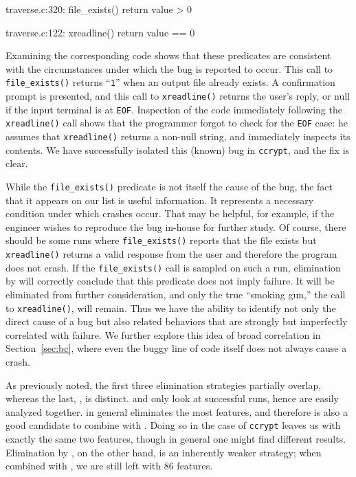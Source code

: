 \begin{features}
\item traverse.c:320: file\_exists() return value > 0
\item traverse.c:122: xreadline() return value == 0
\end{features}

Examining the corresponding code shows that these predicates are
consistent with the circumstances under which the bug is reported to
occur.  This call to \texttt{file\_exists()} returns ``\texttt{1}'' when an output
file already exists.  A confirmation prompt is presented, and this
call to \texttt{xreadline()} returns the user's reply, or null if the
input terminal is at \texttt{EOF}.  Inspection of the code immediately
following the \texttt{xreadline()} call shows that the programmer
forgot to check for the \texttt{EOF} case: he assumes that
\texttt{xreadline()} returns a non-null string, and immediately
inspects its contents.  We have successfully isolated this (known) bug
in \texttt{ccrypt}, and the fix is clear.

While the \texttt{file\_exists()} predicate is not itself the cause of
the bug, the fact that it appears on our list is useful information.
It represents a necessary condition under which crashes occur.  That
may be helpful, for example, if the engineer wishes to reproduce the
bug in-house for further study.  Of course, there should be some runs
where \texttt{file\_exists()} reports that the file exists but
\texttt{xreadline()} returns a valid response from the user and
therefore the program does not crash.  If the \texttt{file\_exists()}
call is sampled on such a run, elimination by  will correctly conclude that this predicate does not
imply failure.  It will be eliminated from further consideration, and
only the true ``smoking gun,'' the call to \texttt{xreadline()}, will
remain.  Thus we have the ability to identify not only the direct
cause of a bug but also related behaviors that are strongly but
imperfectly correlated with failure.  We further explore this idea of
broad correlation in Section~\ref{sec:bc}, where even the buggy line
of code itself does not always cause a crash.

As previously noted, the first three elimination strategies partially
overlap, whereas the last, , is
distinct.   and  only look at successful runs, hence are easily
analyzed together.   in general
eliminates the most features, and therefore is also a good candidate
to combine with .  Doing so in the
case of \texttt{ccrypt} leaves us with exactly the same two features,
though in general one might find different results.  Elimination by
, on the other hand, is an inherently
weaker strategy; when combined with ,
we are still left with 86 features.

